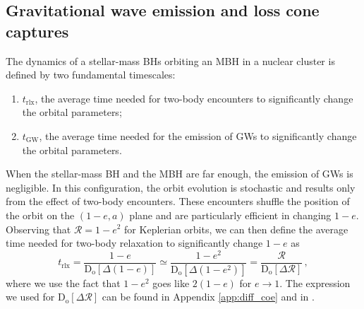 \documentclass[desactivate]{aa}
\newcommand{\lb}[1]{\textcolor{orange}{#1}}
\newcommand{\as}[1]{\textcolor{red}{AS: #1}}
\begin{document}
    \subsection{Gravitational wave emission and loss cone captures}\label{sec:EMRI/DP}
        
        The dynamics of a stellar-mass BHs orbiting an MBH in a nuclear cluster is defined by two fundamental timescales:
        \begin{enumerate}
            \item $t_\mathrm{rlx}$, the average time needed for two-body encounters to significantly change the orbital parameters;
            \item $t_\mathrm{GW}$, the average time needed for the emission of GWs to significantly change the orbital parameters.
        \end{enumerate}
        When the stellar-mass BH and the MBH are far enough, the emission of GWs is negligible. In this configuration, the orbit evolution is stochastic and results only from the effect of two-body encounters. These encounters shuffle the position of the orbit on the $(1-e, a)$ plane and are particularly efficient in changing $1-e$. Observing that $\mathcal{R} = 1-e^2$ for Keplerian orbits, we can then define the average time needed for two-body relaxation to significantly change $1-e$ as
        \begin{equation}
            t_\mathrm{rlx} = \frac{1-e}{\mathrm{D_\mathrm{o}}[\Delta (1-e)]} \simeq \frac{1-e^2}{\mathrm{D_\mathrm{o}}[\Delta (1-e^2)]} = \frac{\mathcal{R}}{\mathrm{D_\mathrm{o}}[\Delta \mathcal{R}]} \, ,
        \end{equation}
        where we use the fact that $1-e^2$ goes like $2(1-e)$ for $e \to 1$. The expression we used for $\mathrm{D_\mathrm{o}}[\Delta \mathcal{R}]$ can be found in Appendix \ref{app:diff_coe} and in \citet{2022MNRAS.514.3270B}. 
\end{document}
